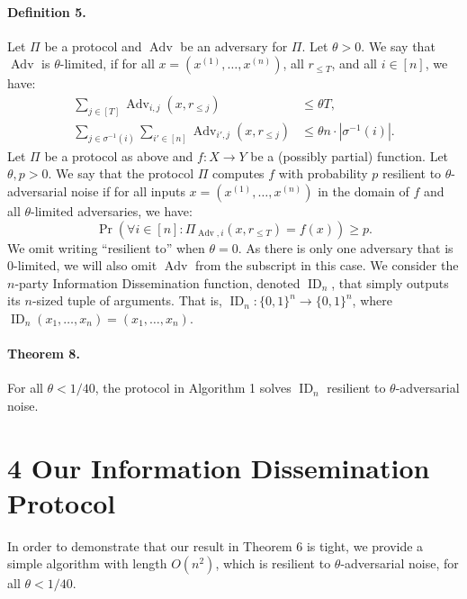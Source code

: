 \documentclass[10pt,a4paper]{article}
\begin{document}
\paragraph{Definition 5.} Let $\Pi$ be a protocol and $\operatorname{Adv}$ be an adversary for $\Pi$. Let $\theta>0$. We say that $\operatorname{Adv}$ is $\theta$-limited, if for all $x=(x^{(1)},\ldots,x^{(n)})$, all $r_{\le T}$, and all $i\in[n]$, we have:
\begin{align*}\sum_{j\in[T]}\operatorname{Adv}_{i,j}(x,r_{\le j})&\le\theta T,\\\sum_{j\in\sigma^{-1}(i)}\sum_{i'\in[n]}\operatorname{Adv}_{i',j}(x,r_{\le j})&\le\theta n\cdot|\sigma^{-1}(i)|.\end{align*}
Let $\Pi$ be a protocol as above and $f:X\to Y$ be a (possibly partial) function. Let $\theta,p>0$. We say that the protocol $\Pi$ computes $f$ with probability $p$ resilient to $\theta$-adversarial noise if for all inputs $x=(x^{(1)},\ldots,x^{(n)})$ in the domain of $f$ and all $\theta$-limited adversaries, we have:
\[\Pr(\forall i\in[n]:\Pi_{\operatorname{Adv},i}(x,r_{\le T})=f(x))\ge p.\]
We omit writing ``resilient to'' when $\theta=0$. As there is only one adversary that is 0-limited, we will also omit $\operatorname{Adv}$ from the subscript in this case.
We consider the $n$-party Information Dissemination function, denoted $\operatorname{ID}_n$, that simply outputs its $n$-sized tuple of arguments. That is, $\operatorname{ID}_n:\{0,1\}^n\to\{0,1\}^n$, where $\operatorname{ID}_n(x_1,\ldots,x_n)=(x_1,\ldots,x_n)$.

\paragraph{Theorem 8.} For all $\theta<1/40$, the protocol in Algorithm 1 solves $\operatorname{ID}_n$ resilient to $\theta$-adversarial noise.

\section*{4 Our Information Dissemination Protocol}
In order to demonstrate that our result in Theorem 6 is tight, we provide a simple algorithm with length $O(n^2)$, which is resilient to $\theta$-adversarial noise, for all $\theta<1/40$.
\end{document}
